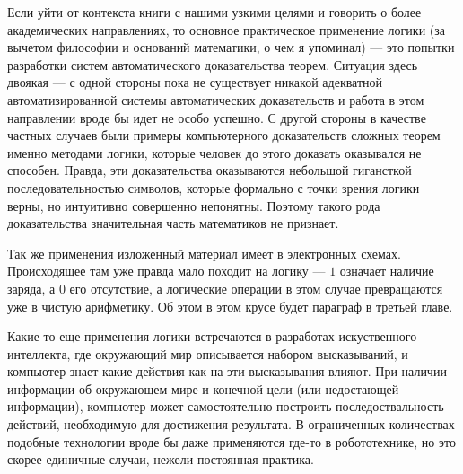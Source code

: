 Если уйти от контекста книги с нашими узкими целями и говорить о более академических направлениях, то основное практическое применение логики (за вычетом философии и оснований математики, о чем я упоминал) --- это попытки разработки систем автоматического доказательства теорем. Ситуация здесь двоякая --- с одной стороны пока не существует никакой адекватной автоматизированной системы автоматических доказательств и работа в этом направлении вроде бы идет не особо успешно. С другой стороны в качестве частных случаев были примеры компьютерного доказательств сложных теорем именно методами логики, которые человек до этого доказать оказывался не способен. Правда, эти доказательства оказываются небольшой гигансткой последовательностью символов, которые формально с точки зрения логики верны, но интуитивно совершенно непонятны. Поэтому такого рода доказательства значительная часть математиков не признает.

Так же применения изложенный материал имеет в электронных схемах. Происходящее там уже правда мало походит на логику --- $1$ означает наличие заряда, а $0$ его отсутствие, а логические операции в этом случае превращаются уже в чистую арифметику. Об этом в этом крусе будет параграф в третьей главе.

Какие-то еще применения логики встречаются в разработах искуственного интеллекта, где окружающий мир описывается набором высказываний, и компьютер знает какие действия как на эти высказывания влияют. При наличии информации об окружающем мире и конечной цели (или недостающей информации), компьютер может самостоятельно построить последоствальность действий, необходимую для достижения результата. В ограниченных количествах подобные технологии вроде бы даже применяются где-то в робототехнике, но это скорее единичные случаи, нежели постоянная практика.
